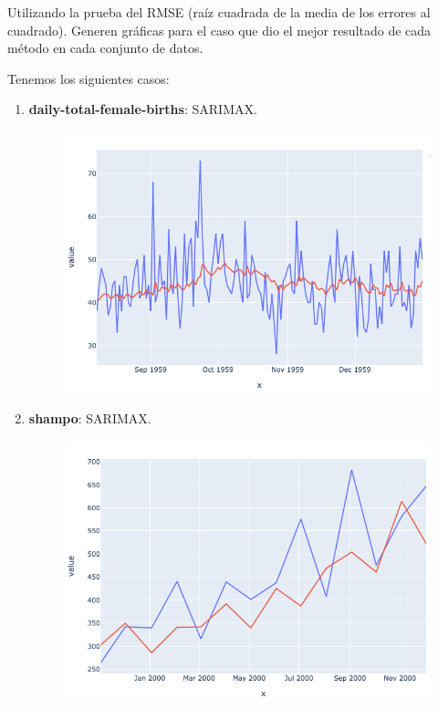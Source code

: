 \begin{problema}
	Utilizando la prueba del RMSE (raíz cuadrada de la media de los errores al cuadrado).  Generen gráficas para el caso que dio el mejor resultado de cada método en cada conjunto de datos.
	\begin{sol}
		Tenemos los siguientes casos: 
		\begin{enumerate}
			\item \textbf{daily-total-female-births}: SARIMAX. 
			\begin{figure}[H]
				\centering 
				\includegraphics[scale=0.5]{Images/1.1}
			\end{figure}
			\item \textbf{shampo}: SARIMAX. 
			\begin{figure}[H]
				\centering 
				\includegraphics[scale=0.5]{Images/1.2}

\end{figure}
\end{enumerate}
\end{sol}
\end{problema}
